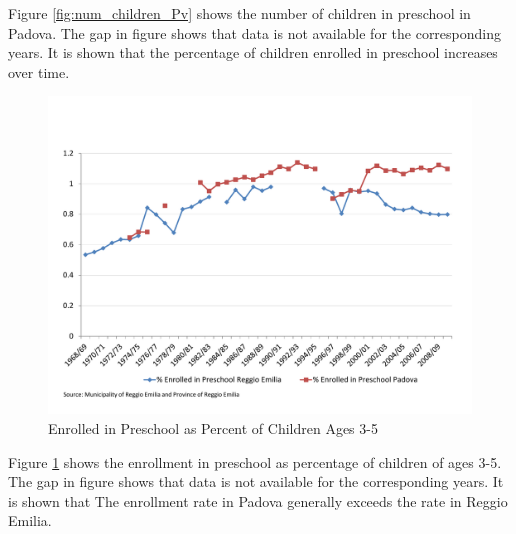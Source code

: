 Figure \ref{fig:num_children_Pv} shows the number of children in preschool in Padova. The gap in figure shows that data is not available for the corresponding years. It is shown that the percentage of children enrolled in preschool increases over time. 


\begin{figure}[H] \caption{Enrolled in Preschool as Percent of Children Ages 3-5} \label{fig:enroll-pres-3-5}
	\centering
	\includegraphics[scale=0.65]{../../output/image/Enrollement_Preschool_age3-5.pdf}
\end{figure}

Figure \ref{fig:enroll-pres-3-5} shows the enrollment in preschool as percentage of children of ages 3-5. The gap in figure shows that data is not available for the corresponding years. It is shown that The enrollment rate in Padova generally exceeds the rate in Reggio Emilia. 